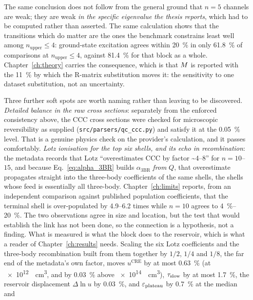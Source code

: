 The same conclusion does not follow from the general ground that $n=5$
channels are weak; they are weak \emph{in the specific eigenvalue the thesis
reports}, which had to be computed rather than asserted. The same calculation
shows that the transitions which do matter are the ones the benchmark constrains
least well among $n_{\text{upper}} \le 4$: ground-state excitation agrees within
\SI{20}{\percent} in only \SI{61.8}{\percent} of comparisons at
$n_{\text{upper}} \le 4$, against \SI{81.4}{\percent} for that block as a whole.
Chapter~\ref{ch:theory} carries the consequence, which is that $M$ is
reported with the \SI{11}{\percent} by which the R-matrix substitution moves
it: the sensitivity to one dataset substitution, not an uncertainty.

Three further soft spots are worth naming rather than leaving to be discovered.
\emph{Detailed balance in the raw cross sections}: separately from the enforced
consistency above, the CCC cross sections were checked for microscopic
reversibility as supplied (\texttt{src/parsers/qc\_ccc.py}) and satisfy it at
the \SI{0.05}{\percent} level. That is a genuine physics check on the provider's
calculation, and it passes comfortably. \emph{Lotz ionisation for the top six
shells, and its echo in recombination}: the metadata records that Lotz
``overestimates CCC by factor \textasciitilde4--8'' for $n = 10$--$15$, and
because Eq.~\eqref{eq:alpha_3BR} builds $\alpha_{\mathrm{3BR}}$ \emph{from} $Q$,
that overestimate propagates straight into the three-body coefficients of the
same shells, the shells whose feed is essentially all three-body.
Chapter~\ref{ch:limits} reports, from an independent comparison against
published population coefficients, that the terminal shell is over-populated by
4.9--6.2 times while $n=10$ agrees to \SIrange{4}{20}{\percent}. The two
observations agree in size and location, but the test that would establish the
link has not been done, so the connection is a hypothesis, not a finding. What
is measured is what the block does to the reservoir, which is what a reader of
Chapter~\ref{ch:results} needs. Scaling the six Lotz coefficients and the
three-body recombination built from them together by $1/2$, $1/4$ and $1/8$,
the far end of the metadata's own factor, moves $u^{\mathrm{CRE}}$ by at most
\SI{0.63}{\percent} (at \SI{e12}{\per\cubic\centi\metre}, and by
\SI{0.03}{\percent} above \SI{e14}{\per\cubic\centi\metre}), $\tau_{\mathrm{slow}}$ by at
most \SI{1.7}{\percent}, the reservoir displacement $\Delta\ln u$ by
\SI{0.03}{\percent}, and $\varepsilon_{\mathrm{plateau}}$ by \SI{0.7}{\percent} at the median and

